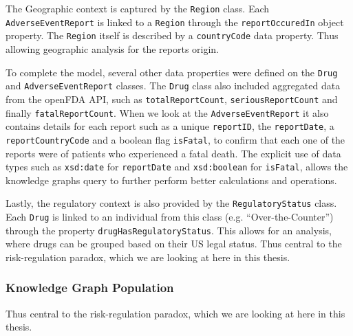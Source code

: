 The Geographic context is captured by the \texttt{Region} class. Each \texttt{Adverse\-Event\-Report} is linked to a \texttt{Region} through the \texttt{report\-Occured\-In} object property. The \texttt{Region} itself is described by a \texttt{country\-Code} data property. Thus allowing geographic analysis for the reports origin.

To complete the model, several other data properties were defined on the \texttt{Drug} and \texttt{Adverse\-Event\-Report} classes. The \texttt{Drug} class also included aggregated data from the openFDA API, such as \texttt{total\-Report\-Count}, \texttt{serious\-Report\-Count} and finally \texttt{fatal\-Report\-Count}. When we look at the \texttt{Adverse\-Event\-Report} it also contains details for each report such as a unique \texttt{report\-ID}, the \texttt{report\-Date}, a \texttt{report\-Country\-Code} and a boolean flag \texttt{is\-Fatal}, to confirm that each one of the reports were of patients who experienced a fatal death. The explicit use of data types such as \texttt{xsd:date} for \texttt{report\-Date} and \texttt{xsd:boolean} for \texttt{is\-Fatal}, allows the knowledge graphs query to further perform better calculations and operations.

Lastly, the regulatory context is also provided by the \texttt{Regulatory\-Status} class. Each \texttt{Drug} is linked to an individual from this class (e.g. “Over-the-Counter”) through the property \texttt{drug\-Has\-Regulatory\-Status}. This allows for an analysis, where drugs can be grouped based on their US legal status. Thus central to the risk-regulation paradox, which we are looking at here in this thesis.

\subsubsection{Knowledge Graph Population}
Thus central to the risk-regulation paradox, which we are looking at here in this thesis.

